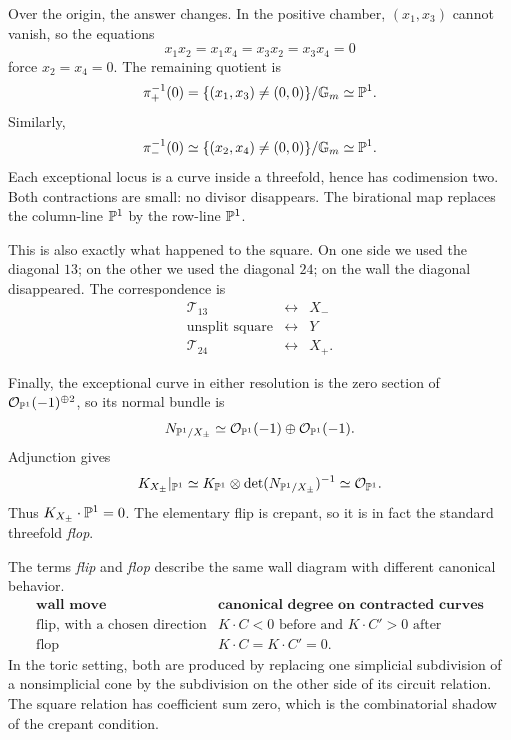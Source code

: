 Over the origin, the answer changes.  In the positive chamber,
\((x_1,x_3)\) cannot vanish, so the equations
\[
x_1x_2=x_1x_4=x_3x_2=x_3x_4=0
\]
force \(x_2=x_4=0\).  The remaining quotient is
\[
\pi_+^{-1}(0)
=
\{(x_1,x_3)\neq(0,0)\}/\mathbb{G}_{m}
\simeq\mathbb{P}^1.
\]
Similarly,
\[
\pi_-^{-1}(0)
\simeq
\{(x_2,x_4)\neq(0,0)\}/\mathbb{G}_{m}
\simeq\mathbb{P}^1.
\]
Each exceptional locus is a curve inside a threefold, hence has
codimension two.  Both contractions are small: no divisor disappears.
The birational map replaces the column-line \(\mathbb{P}^1\) by the row-line
\(\mathbb{P}^1\).

This is also exactly what happened to the square.  On one side we used
the diagonal \(13\); on the other we used the diagonal \(24\); on the
wall the diagonal disappeared.  The correspondence is
\[
\boxed{
\begin{array}{ccc}
\mathcal T_{13}
&\longleftrightarrow&
X_-
\\
\text{unsplit square}
&\longleftrightarrow&
Y
\\
\mathcal T_{24}
&\longleftrightarrow&
X_+.
\end{array}}
\]

Finally, the exceptional curve in either resolution is the zero
section of
\(\mathcal O_{\mathbb{P}^1}(-1)^{\oplus2}\), so its normal bundle is
\[
N_{\mathbb{P}^1/X_\pm}
\simeq
\mathcal O_{\mathbb{P}^1}(-1)\oplus
\mathcal O_{\mathbb{P}^1}(-1).
\]
Adjunction gives
\[
K_{X_\pm}|_{\mathbb{P}^1}
\simeq
K_{\mathbb{P}^1}\otimes
\det(N_{\mathbb{P}^1/X_\pm})^{-1}
\simeq
\mathcal O_{\mathbb{P}^1}.
\]
Thus \(K_{X_\pm}\cdot\mathbb{P}^1=0\).  The elementary flip is crepant, so it
is in fact the standard threefold \emph{flop}.

\begin{agcheatsheet}
The terms \emph{flip} and \emph{flop} describe the same wall diagram
with different canonical behavior.
\[
\begin{array}{c|c}
\textbf{wall move}&\textbf{canonical degree on contracted curves}
\\
\hline
\text{flip, with a chosen direction}
&K\cdot C<0\text{ before and }K\cdot C'>0\text{ after}
\\
\text{flop}
&K\cdot C=K\cdot C'=0.
\end{array}
\]
In the toric setting, both are produced by replacing one simplicial
subdivision of a nonsimplicial cone by the subdivision on the other
side of its circuit relation.  The square relation has coefficient sum
zero, which is the combinatorial shadow of the crepant condition.
\end{agcheatsheet}

